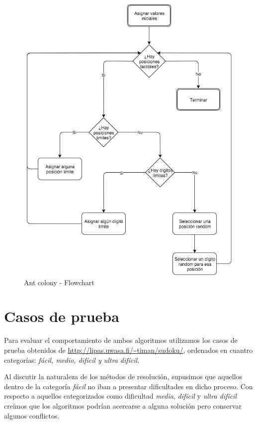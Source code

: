 \documentclass[a4paper,spanish]{article}
\begin{document}
\begin{figure}[h]
	\centering
	\includegraphics[scale=0.55]{./img/ant_workflow.png}
	\caption{Ant colony - Flowchart}
	\label{img:ants_flowchart}
\end{figure}

\clearpage

\section{Casos de prueba}

Para evaluar el comportamiento de ambos algoritmos utilizamos los casos de prueba obtenidos de
\url{http://lipas.uwasa.fi/~timan/sudoku/}, ordenados en cuantro categorías: \textit{fácil, medio, difícil y ultra difícil}.

Al discutir la naturaleza de los métodos de resolución, supusimos que aquellos dentro de la
categoría \emph{fácil} no iban a presentar dificultades en dicho proceso. Con respecto a aquellos
categorizados como dificultad \emph{media}, \emph{difícil} y \emph{ultra difícil} creímos que los algoritmos podrían
acercarse a alguna solución pero conservar algunos conflictos.
\end{document}
